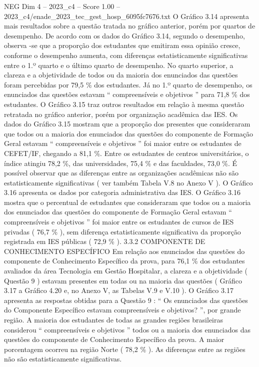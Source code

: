 \begin{textsample}{NEG Dim 4 – 2023\_c4 – Score 1.00 – 2023\_c4/enade\_2023\_tec\_gest\_hosp\_6095fc7676.txt}
O Gráfico 3.14 apresenta mais resultados sobre a questão tratada no gráfico anterior, porém por quartos de desempenho.
De acordo com os dados do Gráfico 3.14, segundo o desempenho, observa -se que a proporção dos estudantes que emitiram essa opinião cresce, conforme o desempenho aumenta, com diferenças estatisticamente significativas entre o 1.º quarto e o último quarto de desempenho.
No quarto superior, a clareza e a objetividade de todos ou da maioria dos enunciados das questões foram percebidas por 79,5 \% dos estudantes.
Já no 1.º quarto de desempenho, os enunciados das questões estavam “ compreensíveis e objetivos ” para 71,8 \% dos estudantes.
O Gráfico 3.15 traz outros resultados em relação à mesma questão retratada no gráfico anterior, porém por organização acadêmica das IES.
Os dados do Gráfico 3.15 mostram que a proporção dos presentes que consideraram que todos ou a maioria dos enunciados das questões do componente de Formação Geral estavam “ compreensíveis e objetivos ” foi maior entre os estudantes de CEFET/IF, chegando a 81,1 \%.
Entre os estudantes de centros universitários, o índice atingiu 78,2 \%, das universidades, 75,4 \% e das faculdades, 73,0 \%.
É possível observar que as diferenças entre as organizações acadêmicas não são estatisticamente significativas ( ver também Tabela V.8 no Anexo V ).
O Gráfico 3.16 apresenta os dados por categoria administrativa das IES.
O Gráfico 3.16 mostra que o percentual de estudantes que consideraram que todos ou a maioria dos enunciados das questões do componente de Formação Geral estavam “ compreensíveis e objetivos ” foi maior entre os estudantes de cursos de IES privadas ( 76,7 \% ), sem diferença estatisticamente significativa da proporção registrada em IES públicas ( 72,9 \% ). 3.3.2 COMPONENTE DE CONHECIMENTO ESPECÍFICO Em relação aos enunciados das questões do componente de Conhecimento Específico da prova, para 76,1 \% dos estudantes avaliados da área Tecnologia em Gestão Hospitalar, a clareza e a objetividade ( Questão 9 ) estavam presentes em todas ou na maioria das questões ( Gráfico 3.17 a Gráfico 4.20 e, no Anexo V, as Tabelas V.9 e V.10 ).
O Gráfico 3.17 apresenta as respostas obtidas para a Questão 9 : “ Os enunciados das questões do Componente Específico estavam compreensíveis e objetivos? ”, por grande região.
A maioria dos estudantes de todas as grandes regiões brasileiras considerou “ compreensíveis e objetivos ” todos ou a maioria dos enunciados das questões do componente de Conhecimento Específico da prova.
A maior porcentagem ocorreu na região Norte ( 78,2 \% ).
As diferenças entre as regiões não são estatisticamente significativas.

\end{textsample}
